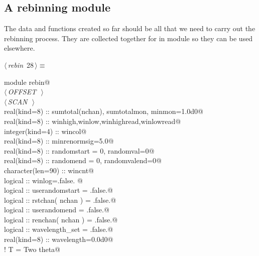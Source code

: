 \documentclass[10pt,a4paper,notitlepage]{article}
\begin{document}
\subsection{A rebinning module}
The data and functions created so far should be all that we need to carry out
the rebinning process. 
They are collected together for in module so they can be
used elsewhere.
\begin{flushleft} \small
\begin{minipage}{\linewidth}\label{scrap32}\raggedright\small
{} $\langle\,${\it rebin}\nobreak\ {\footnotesize {28}}$\,\rangle\equiv$
\vspace{-1ex}
\begin{list}{}{} \item
\mbox{}\verb@      module rebin@\\
\mbox{}\verb@@\hbox{$\langle\,${\it OFFSET}\nobreak\ {\footnotesize {}}$\,\rangle$}\verb@@\\
\mbox{}\verb@@\hbox{$\langle\,${\it SCAN}\nobreak\ {\footnotesize {}}$\,\rangle$}\verb@@\\
\mbox{}\verb@      real(kind=8) :: sumtotal(nchan), sumtotalmon, minmon=1.0d0@\\
\mbox{}\verb@      real(kind=8) :: winhigh,winlow,winhighread,winlowread@\\
\mbox{}\verb@      integer(kind=4) :: wincol@\\
\mbox{}\verb@      real(kind=8) :: minrenormsig=5.0@\\
\mbox{}\verb@      real(kind=8) :: randomstart = 0, randomval=0@\\
\mbox{}\verb@      real(kind=8) :: randomend = 0, randomvalend=0@\\
\mbox{}\verb@      character(len=90) :: wincnt@\\
\mbox{}\verb@      logical :: winlog=.false. @\\
\mbox{}\verb@      logical :: userandomstart = .false.@\\
\mbox{}\verb@      logical :: rstchan( nchan ) = .false.@\\
\mbox{}\verb@      logical :: userandomend = .false.@\\
\mbox{}\verb@      logical :: renchan( nchan ) = .false.@\\
\mbox{}\verb@      logical :: wavelength_set = .false.@\\
\mbox{}\verb@      real(kind=8) :: wavelength=0.0d0@\\
\mbox{}\verb@      ! T = Two theta@\\

\end{list}
\end{minipage}
\end{flushleft}
\end{document}
